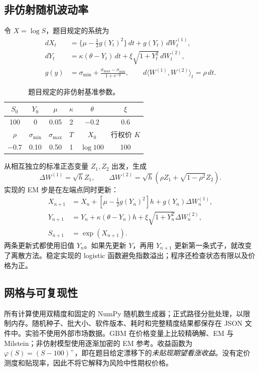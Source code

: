 \documentclass[11pt,a4paper,fontset=none]{ctexart}
\begin{document}
\subsection{非仿射随机波动率}
令 $X=\log S$，题目规定的系统为
\begin{align}
dX_t&=\{\mu-\tfrac12g(Y_t)^2\}\,dt+g(Y_t)\,dW_t^{(1)},\\
dY_t&=\kappa(\theta-Y_t)\,dt+\xi\sqrt{1+Y_t^2}\,dW_t^{(2)},\\
g(y)&=\sigma_{\min}+\frac{\sigma_{\max}-\sigma_{\min}}{1+e^{-y}},
\qquad d\langle W^{(1)},W^{(2)}\rangle_t=\rho\,dt.
\end{align}
\begin{table}[H]\centering
\caption{题目规定的非仿射基准参数。}
\begin{tabular}{cccccc}\toprule
$S_0$ & $Y_0$ & $\mu$ & $\kappa$ & $\theta$ & $\xi$\\\midrule
100 & 0 & 0.05 & 2 & $-0.2$ & 0.6\\\midrule
$\rho$ & $\sigma_{\min}$ & $\sigma_{\max}$ & $T$ & $X_0$ & 行权价 $K$\\\midrule
$-0.7$ & 0.10 & 0.50 & 1 & $\log 100$ & 100\\\bottomrule
\end{tabular}
\end{table}
从相互独立的标准正态变量 $Z_1,Z_2$ 出发，生成
\begin{equation}
\Delta W^{(1)}=\sqrt h Z_1,\qquad
\Delta W^{(2)}=\sqrt h(\rho Z_1+\sqrt{1-\rho^2}Z_2).
\end{equation}
实现的 EM 步是在左端点同时更新：
\begin{align}
X_{n+1}&=X_n+[\mu-\tfrac12g(Y_n)^2]h+g(Y_n)\Delta W_n^{(1)},\\
Y_{n+1}&=Y_n+\kappa(\theta-Y_n)h+\xi\sqrt{1+Y_n^2}\Delta W_n^{(2)},\\
S_{n+1}&=\exp(X_{n+1}).
\end{align}
两条更新式都使用旧值 $Y_n$。如果先更新 $Y$，再用 $Y_{n+1}$ 更新第一条式子，就改变了离散方法。稳定实现的 logistic 函数避免指数溢出；程序还检查状态有限以及价格为正。

\subsection{网格与可复现性}

所有计算使用双精度和固定的 NumPy 随机数生成器；正式路径分批处理，以限制内存。随机种子、批大小、软件版本、耗时和完整精度结果都保存在 JSON 文件中。实验不使用外部市场数据。GBM 在价格变量上比较精确解、EM 与 Milstein；非仿射模型使用逐渐加密的 EM 参考。收益函数为 $\varphi(S)=(S-100)^+$，即在题目给定漂移下的\emph{未贴现期望看涨收益}。没有定价测度和贴现率，因此不将它解释为风险中性期权价格。
\end{document}
